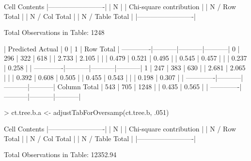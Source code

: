 \documentclass{article}
\begin{document}
\begin{Schunk}
\begin{Soutput}
   Cell Contents
|-------------------------|
|                       N |
| Chi-square contribution |
|           N / Row Total |
|           N / Col Total |
|         N / Table Total |
|-------------------------|

 
Total Observations in Table:  1248 

 
             | Predicted 
      Actual |         0 |         1 | Row Total | 
-------------|-----------|-----------|-----------|
           0 |       296 |       322 |       618 | 
             |     2.733 |     2.105 |           | 
             |     0.479 |     0.521 |     0.495 | 
             |     0.545 |     0.457 |           | 
             |     0.237 |     0.258 |           | 
-------------|-----------|-----------|-----------|
           1 |       247 |       383 |       630 | 
             |     2.681 |     2.065 |           | 
             |     0.392 |     0.608 |     0.505 | 
             |     0.455 |     0.543 |           | 
             |     0.198 |     0.307 |           | 
-------------|-----------|-----------|-----------|
Column Total |       543 |       705 |      1248 | 
             |     0.435 |     0.565 |           | 
-------------|-----------|-----------|-----------|
\end{Soutput}
\begin{Sinput}
> ct.tree.b.a <- adjustTabForOversamp(ct.tree.b, .051)
\end{Sinput}
\begin{Soutput}
   Cell Contents
|-------------------------|
|                       N |
| Chi-square contribution |
|           N / Row Total |
|           N / Col Total |
|         N / Table Total |
|-------------------------|

 
Total Observations in Table:  12352.94 


\end{Soutput}
\end{Schunk}
\end{document}
